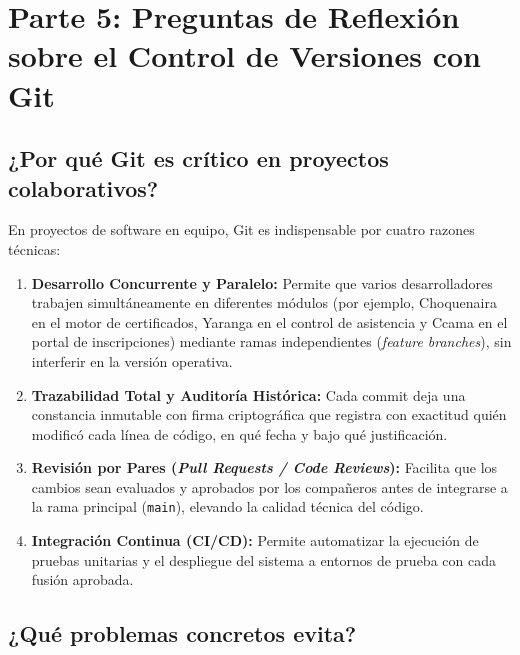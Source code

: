 
\section{Parte 5: Preguntas de Reflexión sobre el Control de Versiones con Git}

\subsection{¿Por qué Git es crítico en proyectos colaborativos?}

En proyectos de software en equipo, Git es indispensable por cuatro razones técnicas:

\begin{enumerate}\setlength\itemsep{0.2em}
    \item \textbf{Desarrollo Concurrente y Paralelo:} Permite que varios desarrolladores trabajen simultáneamente en diferentes módulos (por ejemplo, Choquenaira en el motor de certificados, Yaranga en el control de asistencia y Ccama en el portal de inscripciones) mediante ramas independientes (\textit{feature branches}), sin interferir en la versión operativa.
    \item \textbf{Trazabilidad Total y Auditoría Histórica:} Cada commit deja una constancia inmutable con firma criptográfica que registra con exactitud quién modificó cada línea de código, en qué fecha y bajo qué justificación.
    \item \textbf{Revisión por Pares (\textit{Pull Requests / Code Reviews}):} Facilita que los cambios sean evaluados y aprobados por los compañeros antes de integrarse a la rama principal (\texttt{main}), elevando la calidad técnica del código.
    \item \textbf{Integración Continua (CI/CD):} Permite automatizar la ejecución de pruebas unitarias y el despliegue del sistema a entornos de prueba con cada fusión aprobada.
\end{enumerate}

\subsection{¿Qué problemas concretos evita?}

